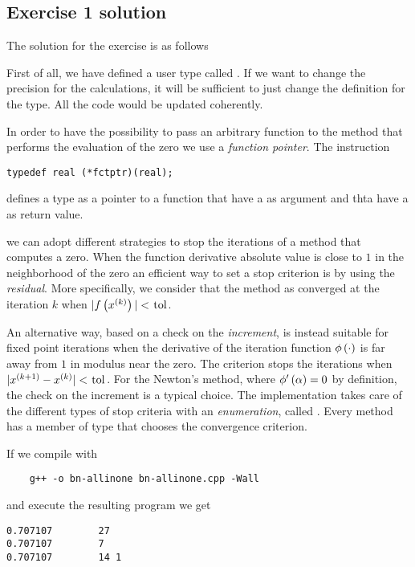 \subsection*{Exercise 1 solution}

The solution for the exercise is as follows
%
\lstset{basicstyle=\scriptsize\sf}
    
\lstset{basicstyle=\sf}


First of all, we have defined a user type called . If we want to
change the precision for the calculations, it will be sufficient to just change
the definition for the  type. All the code would be updated
coherently.

In order to have the possibility to pass an arbitrary function to the method
that performs the evaluation of the zero we use a \emph{function pointer}. The
instruction
\begin{lstlisting}
typedef real (*fctptr)(real);
\end{lstlisting}
defines a type  as a pointer to a function that have a  as
argument and thta have a  as return value.

we can adopt different strategies to stop the iterations of a method that
computes a zero. When the function derivative absolute value is close to $1$ in
the neighborhood of the zero an efficient way to set a stop criterion is by
using the \emph{residual}. More specifically, we consider that the method as
converged at the iteration $k$ when $\module{\function{f}{x\iter{k}}} <
\cpp{tol}$.

An alternative way, based on a check on the \emph{increment}, is instead
suitable for fixed point iterations when the derivative of the iteration
function $\phi\left( \cdot\right)$ is far away from $1$ in modulus near the zero.
The criterion stops the iterations when $\module{x\iter{k+1} - x\iter{k}} <
\cpp{tol}$. For the Newton's method, where $\phi'\left( \alpha\right) = 0$ by
definition, the check on the increment is a typical choice. The implementation
takes care of the different types of stop criteria with an \emph{enumeration},
called . Every method has a member  of type
 that chooses the convergence criterion.

If we compile with
\begin{verbatim}
    g++ -o bn-allinone bn-allinone.cpp -Wall
\end{verbatim}
and execute the resulting program we get
\begin{verbatim}
0.707107        27
0.707107        7
0.707107        14 1
\end{verbatim}

